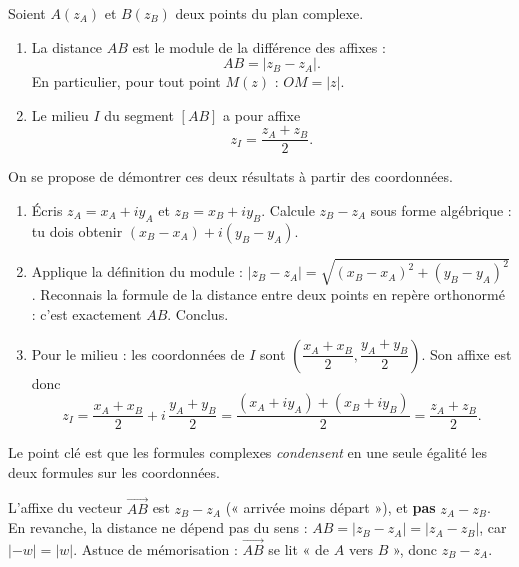 \documentclass[11pt]{article}
\begin{document}
\begin{propriete}
Soient $A(z_A)$ et $B(z_B)$ deux points du plan complexe.
\begin{enumerate}
\item La distance $AB$ est le module de la différence des affixes :
\[ AB = |z_B - z_A|. \]
En particulier, pour tout point $M(z)$ : $OM = |z|$.
\item Le milieu $I$ du segment $[AB]$ a pour affixe
\[ z_I = \frac{z_A + z_B}{2}. \]
\end{enumerate}
\end{propriete}

\begin{experience}
On se propose de démontrer ces deux résultats à partir des coordonnées.
\begin{enumerate}
\item Écris $z_A = x_A + iy_A$ et $z_B = x_B + iy_B$. Calcule $z_B - z_A$ sous forme algébrique : tu dois obtenir $(x_B - x_A) + i(y_B - y_A)$.
\item Applique la définition du module : $|z_B - z_A| = \sqrt{(x_B - x_A)^2 + (y_B - y_A)^2}$. Reconnais la formule de la distance entre deux points en repère orthonormé : c'est exactement $AB$. Conclus.
\item Pour le milieu : les coordonnées de $I$ sont $\left(\dfrac{x_A + x_B}{2}, \dfrac{y_A + y_B}{2}\right)$. Son affixe est donc
\[ z_I = \frac{x_A + x_B}{2} + i\,\frac{y_A + y_B}{2} = \frac{(x_A + iy_A) + (x_B + iy_B)}{2} = \frac{z_A + z_B}{2}. \]
\end{enumerate}
Le point clé est que les formules complexes \emph{condensent} en une seule égalité les deux formules sur les coordonnées.
\end{experience}

\begin{attention}
L'affixe du vecteur $\overrightarrow{AB}$ est $z_B - z_A$ (« arrivée moins départ »), et \textbf{pas} $z_A - z_B$. En revanche, la distance ne dépend pas du sens : $AB = |z_B - z_A| = |z_A - z_B|$, car $|-w| = |w|$. Astuce de mémorisation : $\overrightarrow{AB}$ se lit « de $A$ vers $B$ », donc $z_B - z_A$.
\end{attention}
\end{document}
